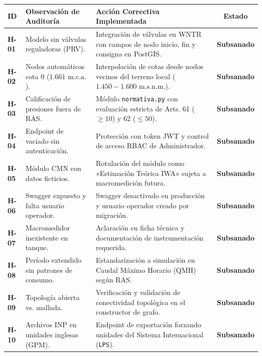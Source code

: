 \documentclass[11pt,letterpaper]{article}
\begin{document}
\vspace{0.5em}
\noindent
\small
\begin{tabularx}{\textwidth}{p{1.2cm}p{4.2cm}p{6.8cm}c}
\toprule
\textbf{ID} & \textbf{Observación de Auditoría} & \textbf{Acción Correctiva Implementada} & \textbf{Estado} \\
\midrule
\rowcolor{LightGray}
\textbf{H-01} & Modelo sin válvulas reguladoras (PRV). & Integración de válvulas en WNTR con campos de nodo inicio, fin y consigna en PostGIS. & \textcolor{AlertGreen}{\textbf{Subsanado}} \\
\textbf{H-02} & Nodos automáticos cota 0 ($1.661\text{ m.c.a.}$). & Interpolación de cotas desde nodos vecinos del terreno local ($1.450-1.600\text{ m.s.n.m.}$). & \textcolor{AlertGreen}{\textbf{Subsanado}} \\
\rowcolor{LightGray}
\textbf{H-03} & Calificación de presiones fuera de RAS. & Módulo \texttt{normativa.py} con evaluación estricta de Arts. 61 ($\ge 10$) y 62 ($\le 50$). & \textcolor{AlertGreen}{\textbf{Subsanado}} \\
\textbf{H-04} & Endpoint de vaciado sin autenticación. & Protección con token JWT y control de acceso RBAC de Administrador. & \textcolor{AlertGreen}{\textbf{Subsanado}} \\
\rowcolor{LightGray}
\textbf{H-05} & Módulo CMN con datos ficticios. & Rotulación del módulo como «Estimación Teórica IWA» sujeta a macromedición futura. & \textcolor{AlertGreen}{\textbf{Subsanado}} \\
\textbf{H-06} & Swagger expuesto y falta usuario operador. & Swagger desactivado en producción y usuario operador creado por migración. & \textcolor{AlertGreen}{\textbf{Subsanado}} \\
\rowcolor{LightGray}
\textbf{H-07} & Macromedidor inexistente en tanque. & Aclaración en ficha técnica y documentación de instrumentación requerida. & \textcolor{AlertGreen}{\textbf{Subsanado}} \\
\textbf{H-08} & Período extendido sin patrones de consumo. & Estandarización a simulación en Caudal Máximo Horario (QMH) según RAS. & \textcolor{AlertGreen}{\textbf{Subsanado}} \\
\rowcolor{LightGray}
\textbf{H-09} & Topología abierta vs. mallada. & Verificación y validación de conectividad topológica en el constructor de grafo. & \textcolor{AlertGreen}{\textbf{Subsanado}} \\
\textbf{H-10} & Archivos INP en unidades inglesas (GPM). & Endpoint de exportación forzando unidades del Sistema Internacional (\texttt{LPS}). & \textcolor{AlertGreen}{\textbf{Subsanado}} \\

\end{tabularx}
\end{document}
